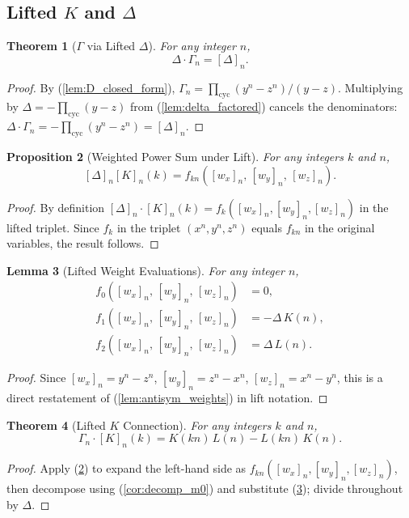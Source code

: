 \documentclass[12pt]{article}
\newtheorem{theorem}{Theorem}[section]
\newtheorem{lemma}[theorem]{Lemma}
\newtheorem{proposition}[theorem]{Proposition}
\theoremstyle{definition}
\newcommand{\cycprod}[1]{\prod_{\mathrm{cyc}}#1}
\newcommand{\lift}[2]{[#1]_{#2}}
\newcommand{\wx}{w_x}
\newcommand{\wy}{w_y}
\newcommand{\wz}{w_z}
\newcommand{\Gdelta}[1]{\Gamma_{#1}}
\begin{document}
	\subsection{Lifted $K$ and $\Delta$}
	
	\begin{theorem}[$\Gamma$ via Lifted $\Delta$]
		\label{thm:gamma_ratio}
		For any integer $n$,
		\[ \Delta \cdot \Gdelta{n} = \lift{\Delta}{n}. \]
	\end{theorem}
	\begin{proof}
		By (\ref{lem:D_closed_form}), $\Gdelta{n} = \cycprod{(y^n-z^n)/(y-z)}$. Multiplying by $\Delta = -\cycprod{(y-z)}$ from (\ref{lem:delta_factored}) cancels the denominators: $\Delta\cdot\Gdelta{n} = -\cycprod{(y^n-z^n)} = \lift{\Delta}{n}$.
	\end{proof}
	
	\begin{proposition}[Weighted Power Sum under Lift]
		\label{prop:lifted_K_def}
		For any integers $k$ and $n$,
		\[ \lift{\Delta}{n}\lift{K}{n}(k) = f_{kn}(\lift{\wx}{n},\, \lift{\wy}{n},\, \lift{\wz}{n}). \]
	\end{proposition}
	\begin{proof}
		By definition $\lift{\Delta}{n} \cdot \lift{K}{n}(k) = f_k(\lift{\wx}{n}, \lift{\wy}{n}, \lift{\wz}{n})$ in the lifted triplet. Since $f_k$ in the triplet $(x^n, y^n, z^n)$ equals $f_{kn}$ in the original variables, the result follows.
	\end{proof}
	
	\begin{lemma}[Lifted Weight Evaluations]
		\label{lem:lifted_weights_eval}
		For any integer $n$,
		\begin{align*}
			f_0(\lift{\wx}{n},\, \lift{\wy}{n},\, \lift{\wz}{n}) &= 0, \\
			f_1(\lift{\wx}{n},\, \lift{\wy}{n},\, \lift{\wz}{n}) &= -\Delta\, K(n), \\
			f_2(\lift{\wx}{n},\, \lift{\wy}{n},\, \lift{\wz}{n}) &= \Delta\, L(n).
		\end{align*}
	\end{lemma}
	\begin{proof}
		Since $\lift{\wx}{n} = y^n - z^n$, $\lift{\wy}{n} = z^n - x^n$, $\lift{\wz}{n} = x^n - y^n$, this is a direct restatement of (\ref{lem:antisym_weights}) in lift notation.
	\end{proof}
	
	\begin{theorem}[Lifted $K$ Connection]
		\label{thm:lifted_K_connection}
		For any integers $k$ and $n$,
		\[
		\Gdelta{n} \cdot \lift{K}{n}(k)
		= K(kn)\,L(n) - L(kn)\,K(n).
		\]
	\end{theorem}
	\begin{proof}
		Apply (\ref{prop:lifted_K_def}) to expand the left-hand side as $f_{kn}(\lift{\wx}{n}, \lift{\wy}{n}, \lift{\wz}{n})$, then decompose using (\ref{cor:decomp_m0}) and substitute (\ref{lem:lifted_weights_eval}); divide throughout by $\Delta$.
	\end{proof}
	
\end{document}
